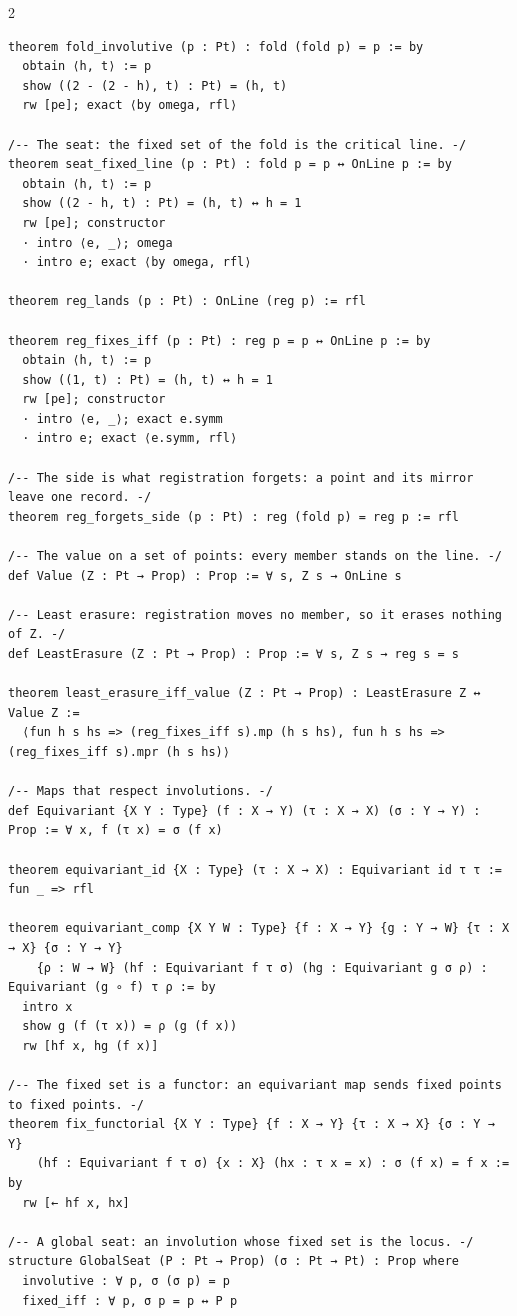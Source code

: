 \documentclass[10pt]{article}
\begin{document}
\begin{multicols}{2}
\begin{Verbatim}[fontsize=\fontsize{6.2}{7.2}\selectfont,breaklines,breakanywhere,breaksymbolleft={}]
theorem fold_involutive (p : Pt) : fold (fold p) = p := by
  obtain ⟨h, t⟩ := p
  show ((2 - (2 - h), t) : Pt) = (h, t)
  rw [pe]; exact ⟨by omega, rfl⟩

/-- The seat: the fixed set of the fold is the critical line. -/
theorem seat_fixed_line (p : Pt) : fold p = p ↔ OnLine p := by
  obtain ⟨h, t⟩ := p
  show ((2 - h, t) : Pt) = (h, t) ↔ h = 1
  rw [pe]; constructor
  · intro ⟨e, _⟩; omega
  · intro e; exact ⟨by omega, rfl⟩

theorem reg_lands (p : Pt) : OnLine (reg p) := rfl

theorem reg_fixes_iff (p : Pt) : reg p = p ↔ OnLine p := by
  obtain ⟨h, t⟩ := p
  show ((1, t) : Pt) = (h, t) ↔ h = 1
  rw [pe]; constructor
  · intro ⟨e, _⟩; exact e.symm
  · intro e; exact ⟨e.symm, rfl⟩

/-- The side is what registration forgets: a point and its mirror leave one record. -/
theorem reg_forgets_side (p : Pt) : reg (fold p) = reg p := rfl

/-- The value on a set of points: every member stands on the line. -/
def Value (Z : Pt → Prop) : Prop := ∀ s, Z s → OnLine s

/-- Least erasure: registration moves no member, so it erases nothing of Z. -/
def LeastErasure (Z : Pt → Prop) : Prop := ∀ s, Z s → reg s = s

theorem least_erasure_iff_value (Z : Pt → Prop) : LeastErasure Z ↔ Value Z :=
  ⟨fun h s hs => (reg_fixes_iff s).mp (h s hs), fun h s hs => (reg_fixes_iff s).mpr (h s hs)⟩

/-- Maps that respect involutions. -/
def Equivariant {X Y : Type} (f : X → Y) (τ : X → X) (σ : Y → Y) : Prop := ∀ x, f (τ x) = σ (f x)

theorem equivariant_id {X : Type} (τ : X → X) : Equivariant id τ τ := fun _ => rfl

theorem equivariant_comp {X Y W : Type} {f : X → Y} {g : Y → W} {τ : X → X} {σ : Y → Y}
    {ρ : W → W} (hf : Equivariant f τ σ) (hg : Equivariant g σ ρ) : Equivariant (g ∘ f) τ ρ := by
  intro x
  show g (f (τ x)) = ρ (g (f x))
  rw [hf x, hg (f x)]

/-- The fixed set is a functor: an equivariant map sends fixed points to fixed points. -/
theorem fix_functorial {X Y : Type} {f : X → Y} {τ : X → X} {σ : Y → Y}
    (hf : Equivariant f τ σ) {x : X} (hx : τ x = x) : σ (f x) = f x := by
  rw [← hf x, hx]

/-- A global seat: an involution whose fixed set is the locus. -/
structure GlobalSeat (P : Pt → Prop) (σ : Pt → Pt) : Prop where
  involutive : ∀ p, σ (σ p) = p
  fixed_iff : ∀ p, σ p = p ↔ P p


\end{Verbatim}
\end{multicols}
\end{document}
